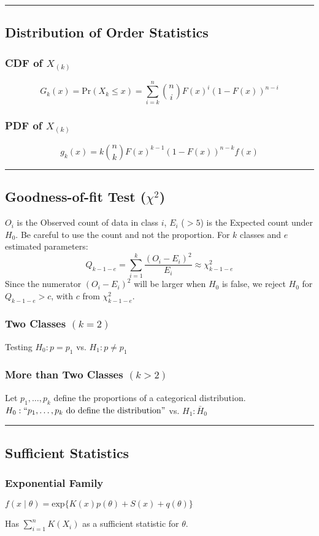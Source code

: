 \documentclass{article}
\begin{document}
\begin{multicols*}{2}
\noindent\rule{\linewidth}{0.25pt}
\subsection*{Distribution of Order Statistics}
\subsubsection*{CDF of $X_{(k)}$}
$$G_{k}(x) = \mbox{Pr}(X_{k} \leq x) = \sum_{i=k}^{n} \binom{n}{i} F(x)^{i} (1 - F(x))^{n-i}$$
\subsubsection*{PDF of $X_{(k)}$}
$$g_{k}(x) = k \binom{n}{k} F(x)^{k-1} (1 - F(x))^{n-k} f(x)$$


\noindent\rule{\linewidth}{0.25pt}
\subsection*{Goodness-of-fit Test ($\chi^{2}$)}
$O_{i}$ is the Observed count of data in class $i$, $E_{i}$ {\color{red} ($> 5$)} is the Expected count under $H_{0}$. Be careful to use the count and not the proportion. For $k$ classes and $e$ estimated parameters:
$$Q_{k-1-e} = \sum_{i=1}^{k} \frac{(O_{i} - E_{i})^{2}}{E_{i}} \approx \chi^{2}_{k-1-e}$$
Since the numerator $(O_{i} - E_{i})^{2}$ will be larger when $H_{0}$ is false, we reject $H_{0}$ for $Q_{k-1-e} > c$, with $c$ from $\chi^{2}_{k-1-e}$.
\subsubsection*{Two Classes $(k = 2)$}
Testing $H_{0}: p = p_{1}$ vs. $H_{1}: p \neq p_{1}$
\subsubsection*{More than Two Classes $(k > 2)$}
Let $p_{1}, \dots, p_{k}$ define the proportions of a categorical distribution. $H_{0}: ``p_{1}, \dots, p_{k} \mbox{ do define the distribution}"$ vs. $H_{1}: \bar{H}_{0}$

\noindent\rule{\linewidth}{0.25pt}
\subsection*{Sufficient Statistics}
\subsubsection*{Exponential Family}
\centerline{$f(x \mid \theta) = \mbox{exp}\{K(x)p(\theta) + S(x) + q(\theta)\}$}
Has $\sum_{i=1}^{n} K(X_{i})$ as a sufficient statistic for $\theta$.

\end{multicols*}
\end{document}
